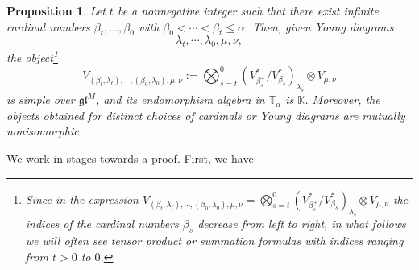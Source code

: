 \documentclass[11pt]{article}
\theoremstyle{plain}
\newtheorem{proposition}[lemma]{Proposition}
\theoremstyle{nonumberplain}
\theoremstyle{plain}
\theoremstyle{nonumberplain}
\newcommand\bK{\mathbb K}
\newcommand\bT{\mathbb T}
\newcommand\fgl{\mathfrak{gl}}
\begin{document}
\begin{proposition}\label{pr.simples}
  Let $t$ be a nonnegative integer such that there exist infinite
  cardinal numbers $\beta_t,\ldots,\beta_0$ with
  $\beta_0<\cdots<\beta_t\leq \alpha$. Then, given Young diagrams
  \begin{equation*}
    \lambda_t,\cdots,\lambda_0, \mu,\nu,
  \end{equation*}
the object\footnote{Since in the expression $V_{(\beta_t,\lambda_t),\cdots,(\beta_0,\lambda_0),\mu,\nu}=
   \bigotimes_{s=t}^0 (V^*_{\beta_s^+}/V^*_{\beta_s})_{\lambda_s}\otimes V_{\mu,\nu}$ the indices of the cardinal numbers $\beta_s$ decrease from left to right, in what follows we will often see tensor product or summation formulas with indices ranging from $t>0$ to $0$.}
\begin{equation}\label{eq:tensor}
   { V_{(\beta_t,\lambda_t),\cdots,(\beta_0,\lambda_0),\mu,\nu}:=}
   \bigotimes_{s=t}^0 (V^*_{\beta_s^+}/V^*_{\beta_s})_{\lambda_s}\otimes V_{\mu,\nu}
\end{equation}
is simple over $\fgl^M${, and its endomorphism algebra in $\bT_\alpha$
  is $\bK$.  Moreover,} the objects obtained for distinct choices of
cardinals or Young diagrams are mutually nonisomorphic.
\end{proposition}


We work in stages towards a proof. First, we have 
\end{document}
